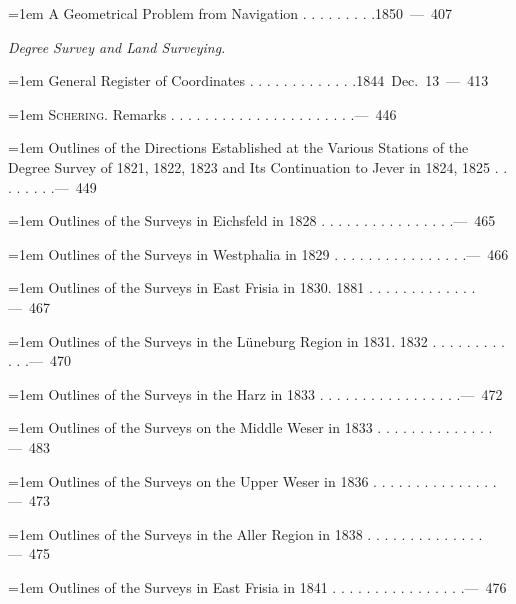 \par\noindent\hangindent=1em A Geometrical Problem from Navigation . . . . . . . . .\hfill{}\hbox{}\nobreak\hfill\mbox{1850 — 407}\par
\par\medskip{}
\noindent\textit{Degree Survey and Land Surveying.}\par
\par\noindent\hangindent=1em General Register of Coordinates . . . . . . . . . . . . .\hfill{}\hbox{}\nobreak\hfill\mbox{1844 Dec. 13 — 413}\par
\par\noindent\hangindent=1em \textsc{Schering}. Remarks . . . . . . . . . . . . . . . . . . . . . .\hfill{}\hbox{}\nobreak\hfill\mbox{— 446}\par
\par\noindent\hangindent=1em Outlines of the Directions Established at the Various Stations of the Degree Survey of 1821, 1822, 1823 and Its Continuation to Jever in 1824, 1825 . . . . . . . .\hfill{}\hbox{}\nobreak\hfill\mbox{— 449}\par
\par\noindent\hangindent=1em Outlines of the Surveys in Eichsfeld in 1828 . . . . . . . . . . . . . . . .\hfill{}\hbox{}\nobreak\hfill\mbox{— 465}\par
\par\noindent\hangindent=1em Outlines of the Surveys in Westphalia in 1829 . . . . . . . . . . . . . . . .\hfill{}\hbox{}\nobreak\hfill\mbox{— 466}\par
\par\noindent\hangindent=1em Outlines of the Surveys in East Frisia in 1830. 1881 . . . . . . . . . . . . .\hfill{}\hbox{}\nobreak\hfill\mbox{— 467}\par
\par\noindent\hangindent=1em Outlines of the Surveys in the Lüneburg Region in 1831. 1832 . . . . . . . . . . . .\hfill{}\hbox{}\nobreak\hfill\mbox{— 470}\par
\par\noindent\hangindent=1em Outlines of the Surveys in the Harz in 1833 . . . . . . . . . . . . . . . . .\hfill{}\hbox{}\nobreak\hfill\mbox{— 472}\par
\par\noindent\hangindent=1em Outlines of the Surveys on the Middle Weser in 1833 . . . . . . . . . . . . . .\hfill{}\hbox{}\nobreak\hfill\mbox{— 483}\par
\par\noindent\hangindent=1em Outlines of the Surveys on the Upper Weser in 1836 . . . . . . . . . . . . . . .\hfill{}\hbox{}\nobreak\hfill\mbox{— 473}\par
\par\noindent\hangindent=1em Outlines of the Surveys in the Aller Region in 1838 . . . . . . . . . . . . . .\hfill{}\hbox{}\nobreak\hfill\mbox{— 475}\par
\par\noindent\hangindent=1em Outlines of the Surveys in East Frisia in 1841 . . . . . . . . . . . . . . . .\hfill{}\hbox{}\nobreak\hfill\mbox{— 476}\par
\endgroup
